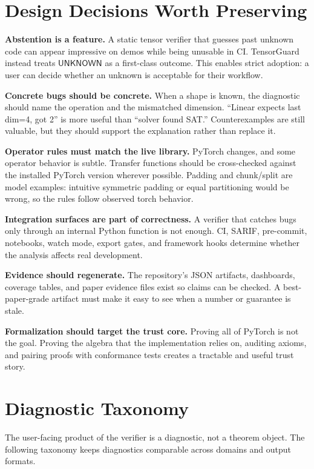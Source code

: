 \documentclass[11pt]{article}
\newcommand{\tg}{TensorGuard}
\newcommand{\unknown}{\ensuremath{\mathsf{UNKNOWN}}}
\begin{document}
\clearpage

\section{Design Decisions Worth Preserving}

\textbf{Abstention is a feature.}  A static tensor verifier that guesses past
unknown code can appear impressive on demos while being unusable in CI.  \tg{}
instead treats \unknown{} as a first-class outcome.  This enables strict
adoption: a user can decide whether an unknown is acceptable for their workflow.

\textbf{Concrete bugs should be concrete.}  When a shape is known, the diagnostic
should name the operation and the mismatched dimension.  ``Linear expects last
dim=4, got 2'' is more useful than ``solver found SAT.''  Counterexamples are
still valuable, but they should support the explanation rather than replace it.

\textbf{Operator rules must match the live library.}  PyTorch changes, and some
operator behavior is subtle.  Transfer functions should be cross-checked against
the installed PyTorch version wherever possible.  Padding and chunk/split are
model examples: intuitive symmetric padding or equal partitioning would be wrong,
so the rules follow observed torch behavior.

\textbf{Integration surfaces are part of correctness.}  A verifier that catches
bugs only through an internal Python function is not enough.  CI, SARIF,
pre-commit, notebooks, watch mode, export gates, and framework hooks determine
whether the analysis affects real development.

\textbf{Evidence should regenerate.}  The repository's JSON artifacts, dashboards,
coverage tables, and paper evidence files exist so claims can be checked.  A
best-paper-grade artifact must make it easy to see when a number or guarantee is
stale.

\textbf{Formalization should target the trust core.}  Proving all of PyTorch is
not the goal.  Proving the algebra that the implementation relies on, auditing
axioms, and pairing proofs with conformance tests creates a tractable and useful
trust story.

\section{Diagnostic Taxonomy}

The user-facing product of the verifier is a diagnostic, not a theorem object.
The following taxonomy keeps diagnostics comparable across domains and output
formats.
\end{document}

